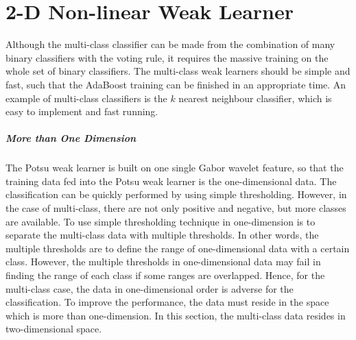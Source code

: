 \chapter{2-D Non-linear Weak Learner}
\label{sec:2dweaklearner}
Although the multi-class classifier can be made from the combination of many binary classifiers with the voting rule, it requires the massive training on the whole set of binary classifiers. The multi-class weak learners should be simple and fast, such that the AdaBoost training can be finished in an appropriate time. An example of multi-class classifiers is the $k$ nearest neighbour classifier, which is easy to implement and fast running.

\paragraph{More than One Dimension}
The Potsu weak learner is built on one single Gabor wavelet feature, so that the training data fed into the Potsu weak learner is the one-dimensional data. The classification can be quickly performed by using simple thresholding. However, in the case of multi-class, there are not only positive and negative, but more classes are available. To use simple thresholding technique in one-dimension is to separate the multi-class data with multiple thresholds. In other words, the multiple thresholds are to define the range of one-dimensional data with a certain class. However, the multiple thresholds in one-dimensional data may fail in finding the range of each class if some ranges are overlapped. Hence, for the multi-class case, the data in one-dimensional order is adverse for the classification. To improve the performance, the data must reside in the space which is more than one-dimension. In this section, the multi-class data resides in two-dimensional space.

